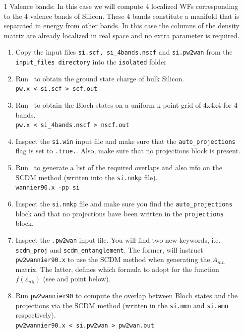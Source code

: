 \documentclass[a4paper,11pt,twoside]{article}
\begin{document}
\begin{itemize}
  \item[1]{Valence bands: In this case we will compute 4 localized WFs corresponding to the 4 valence bands of Silicon. These 4 bands constitute a manifold that is separated in energy from other bands. In this case the columns of the density matrix are already localized in real space and no extra parameter is required.}
  \begin{enumerate}
    \item Copy the input files {\tt si.scf, si\_4bands.nscf} and {\tt si.pw2wan} from the {\tt input\_files directory} into the {\tt isolated} folder
    \item Run \pwscf\ to obtain the ground state charge of bulk Silicon. \\
    {\tt pw.x < si.scf > scf.out}

    \item Run \pwscf\ to obtain the Bloch states on a uniform k-point grid of 4x4x4 for 4 bands. \\
    {\tt pw.x < si\_4bands.nscf > nscf.out}
    
    \item Inspect the {\tt si.win} input file and make sure that the {\tt auto\_projections} flag is set to {\tt .true.}. Also, make sure that no projections block is present.
    \item Run \wannier\ to generate a list of the required overlaps and also info on the SCDM method (written
    into the {\tt si.nnkp} file).\\ 
    {\tt wannier90.x -pp si}
    \item Inspect the {\tt si.nnkp} file and make sure you find the {\tt auto\_projections} block and that no projections have been written in the {\tt projections} block.

    \item Inspect the {\tt .pw2wan} input file. You will find two new keywords, i.e. {\tt scdm\_proj} and {\tt scdm\_entanglement}. The former, will instruct {\tt pw2wannier90.x}  to use the SCDM method when generating the $A_{mn}$ matrix. The latter, defines which formula to adopt for the function $f(\varepsilon_{n\mathbf{k}})$ (see \cite{LinLin-ArXiv2017} and point below).
    \item Run {\tt pw2wannier90} to compute the overlap between Bloch
    states and the projections via the SCDM method (written in the
    {\tt si.mmn} and {\tt si.amn} respectively).\\  
    {\tt pw2wannier90.x < si.pw2wan > pw2wan.out}


\end{enumerate}
\end{itemize}
\end{document}
